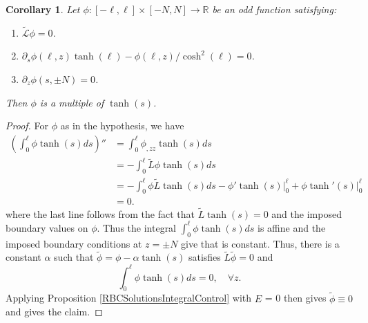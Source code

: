 \documentclass{amsart}
\newtheorem{corollary}{Corollary}
\newcommand{\mb}{\mathbb}
\newcommand{\wt}{\widetilde}
\begin{document}
  \begin{corollary} \label{WhatsInTheRobinKernel}
 Let $\phi: [-\ell, \ell] \times [-N, N] \rightarrow \mb{R}$  be an odd function satisfying:
 \begin{enumerate} 
 \item $\tilde{\mathcal{L}} \phi = 0$. 
\item $\partial_s\phi (\ell, z) \tanh(\ell) - \phi(\ell, z)/\cosh^2(\ell) = 0$.

\item $\partial_z \phi (s, \pm N) = 0 $.
 \end{enumerate}
 Then $\phi$ is a multiple of $\tanh(s)$.
 \end{corollary}
 \begin{proof}
 For $\phi$ as in the hypothesis, we have
 \begin{align*}
\left( \int_{0}^\ell \phi \tanh(s) ds\right)''  & = \int_{0}^\ell \phi_{, z z} \tanh(s) ds \\
 & = -\int_{0}^\ell \wt{L} \phi \tanh(s) ds \\
 & = -\int_{0}^\ell  \phi  \wt{L}\tanh(s) ds - \left. \phi' \tanh(s) \right|_{0}^\ell + \left. \phi \tanh'(s) \right|_{0}^\ell\\
 & = 0.
 \end{align*}
 where the last line follows from the fact that $\wt{L} \tanh(s) = 0$ and the imposed boundary values on $\phi$. Thus the integral $\int_{0}^\ell \phi \tanh(s) ds$ is affine and the imposed boundary conditions at $z = \pm N$ give that is constant. Thus, there is a constant $\alpha$ such that $\wt{\phi} = \phi - \alpha \tanh(s)$ satisfies $\wt{L} \wt{\phi} = 0$ and
 \[
\int_{0}^\ell \phi \tanh(s) ds= 0, \quad \forall z.
 \]
 Applying  Proposition \ref{RBCSolutionsIntegralControl} with $E$  = 0 then gives $\wt{\phi} \equiv 0$ and gives the claim. 
 \end{proof}
 
\end{document}

